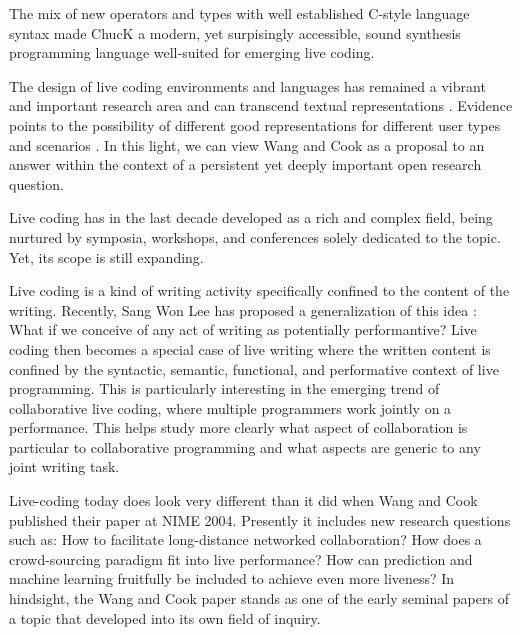 The mix of new operators and types with well established C-style language syntax made ChucK a modern, yet surpisingly accessible, sound synthesis programming language well-suited for emerging live coding.

The design of live coding environments and languages has remained a vibrant and important research area \cite{Roberts:2014}  and can transcend textual representations \cite{McLean:2010}. Evidence points to the possibility of different good representations for different user types and scenarios \cite{Eaglestone:2007}. In this light, we can view Wang and Cook as a proposal to an answer within the context of a persistent yet deeply important open research question.

Live coding has in the last decade developed as a rich and complex field, being nurtured by symposia, workshops, and conferences solely dedicated to the topic. Yet, its scope is still expanding.

Live coding is a kind of writing activity specifically confined to the content of the writing. Recently, Sang Won Lee has proposed a generalization of this idea \cite{Lee:2015}: What if we conceive of any act of writing as potentially performantive? Live coding then becomes a special case of live writing where the written content is confined by the syntactic, semantic, functional, and performative context of live programming. This is particularly interesting in the emerging trend of collaborative live coding, where multiple programmers work jointly on a performance. This helps study more clearly what aspect of collaboration is particular to collaborative programming and what aspects are generic to any joint writing task.

Live-coding today does look very different than it did when Wang and Cook published their paper at NIME 2004. Presently it includes new research questions such as: How to facilitate long-distance networked collaboration? How does a crowd-sourcing paradigm fit into live performance? How can prediction and machine learning fruitfully be included to achieve even more liveness? In hindsight, the Wang and Cook paper stands as one of the early seminal papers of a topic that developed into its own field of inquiry.

